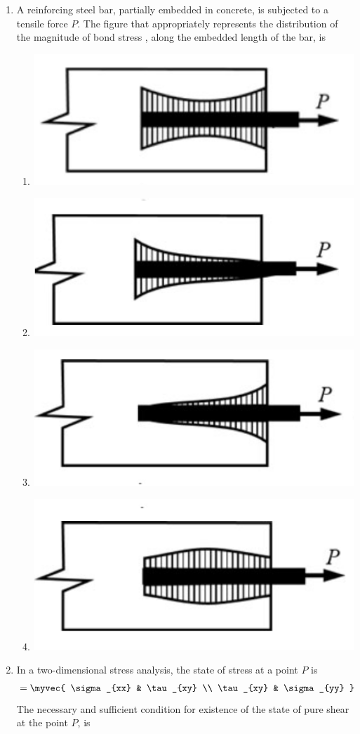 \documentclass[journal]{IEEEtran}
\begin{document}
\begin{enumerate}
\begin{enumerate}

\end{enumerate}


\item A reinforcing steel bar, partially embedded in concrete, is subjected to a tensile force $P$. The figure that appropriately represents the distribution of the magnitude of bond stress , along the embedded length of the bar, is  \hfill {}

\begin{enumerate}

\item \includegraphics[width=0.3\columnwidth]{figs/Q16a.png}
\item \includegraphics[width=0.3\columnwidth]{figs/Q16b.png}  
\item \includegraphics[width=0.3\columnwidth]{figs/Q16c.png}
\item \includegraphics[width=0.3\columnwidth]{figs/Q16d.png}  

\end{enumerate}

\item In a two-dimensional stress analysis, the state of stress at a point $P$ is  
\begin{align}
[\sigma] =
\myvec{ \sigma_{xx} & \tau_{xy} \\ \tau_{xy} & \sigma_{yy} }
\end{align}
The necessary and sufficient condition for existence of the state of pure shear at the point $P$, is \hfill {}


\end{enumerate}
\end{document}
